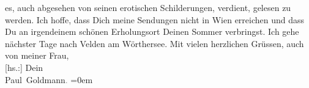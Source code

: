 \begin{ledgroupsized}[t]{13cm}
               es, auch abgesehen von seinen erotischen Schilderungen, verdient, gelesen zu
               werden.\pend
           \pstart
           Ich hoffe, dass Dich meine Sendungen nicht in Wien
               erreichen und dass Du an irgendeinem schönen Erholungsort Deinen Sommer verbringst.
               Ich gehe nächster Tage nach Velden am
               Wörthersee.\pend
           \pstart
           Mit vielen herzlichen Grüssen, auch von meiner Frau, {\\[\baselineskip]}{[}hs.:{]} Dein {\\[\baselineskip]}\spacefill\mbox{Paul Goldmann\textcolor{gray}{.}}\pend
           \leftskip=0em{}
         
         \endnumbering{}\end{ledgroupsized}  \newcommand{\dateiname}{L03518}\newcommand{\titel}{Paul Goldmann an Arthur Schnitzler, 2. 8. 1931}\newcommand{\editorInnen}{Martin Anton Müller und Laura Untner}
      